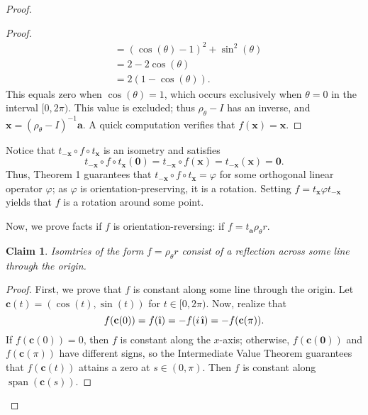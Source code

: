 \documentclass[11pt]{article}
\renewcommand{\vec}[1]{\mathbf{#1}}
\newcommand{\uvec}[1]{\mathop{} \!\hat{\textbf{#1}}}
\newtheorem{claim}{Claim}
\begin{document}
\begin{adjustwidth}{1cm}{}
\begin{proof}
\begin{adjustwidth}{1cm}{}
\begin{proof}
\begin{align*}
					&= (\cos(\theta) - 1)^{2} + \sin^{2}(\theta) \\
					&= 2 - 2 \cos(\theta) \\
					&= 2(1 - \cos(\theta)).
				\end{align*}
				This equals zero when $\cos(\theta) = 1$, which occurs exclusively when $\theta = 0$ in the interval $[0, 2\pi)$. This value is excluded; thus $\rho_{\theta} - I$ has an inverse, and $\vec{x} = (\rho_{\theta} - I)^{-1} \vec{a}$. A quick computation verifies that $f(\vec{x}) = \vec{x}$.
			\end{proof}
		\end{adjustwidth}
		Notice that $t_{-\vec{x}} \circ f \circ t_{\vec{x}}$ is an isometry and satisfies 
		\[
			t_{-\vec{x}} \circ f \circ t_{\vec{x}}(\vec{0}) = t_{\vec{-x}} \circ f (\vec{x}) = t_{-\vec{x}} (\vec{x}) = \vec{0}.
		\]
		Thus, Theorem 1 guarantees that $t_{-\vec{x}} \circ f \circ t_{\vec{x}} = \varphi$ for some orthogonal linear operator $\varphi$; as $\varphi$ is orientation-preserving, it is a rotation. Setting $f = t_{\vec{x}} \varphi t_{-\vec{x}}$ yields that $f$ is a rotation around some point.
		
		Now, we prove facts if $f$ is orientation-reversing: if $f = t_{\vec{a}} \rho_{\theta} r$.
		\begin{adjustwidth}{1cm}{}
			\begin{claim}
				Isomtries of the form $f = \rho_{\theta} r$ consist of a reflection across some line through the origin.
			\end{claim}
			\begin{proof}\renewcommand{\qedsymbol}{}
				First, we prove that $f$ is constant along some line through the origin. Let $\vec{c}(t) = (\cos(t), \sin(t))$ for $t \in [0, 2\pi)$. Now, realize that 
				\[
					f(\vec{c}(0)) = f(\uvec{\i}) = -f(i \uvec{\i}) = - f(\vec{c}(\pi)).
				\]
				If $f(\vec{c}(0)) = 0$, then $f$ is constant along the $x$-axis; otherwise, $f(\vec{c}(\vec{0}))$ and $f(\vec{c}(\pi))$ have different signs, so the Intermediate Value Theorem guarantees that $f(\vec{c}(t))$ attains a zero at $s \in (0, \pi)$. Then $f$ is constant along $\operatorname{span}(\vec{c}(s))$.


\end{proof}
\end{adjustwidth}
\end{proof}
\end{adjustwidth}
\end{document}
